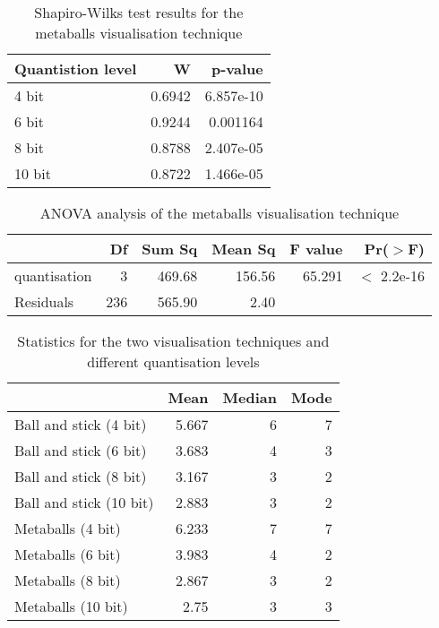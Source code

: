 \begin{table}[h!]
  \begin{tabular}{ | l | r | r | }
  \hline
  Quantistion level &      W &   p-value  \\ \hline
  4 bit             & 0.6942 & 6.857e-10  \\ \hline
  6 bit             & 0.9244 &  0.001164  \\ \hline
  8 bit             & 0.8788 & 2.407e-05  \\ \hline
  10 bit            & 0.8722 & 1.466e-05  \\ \hline
  \end{tabular}
  \caption{Shapiro-Wilks test results for the metaballs visualisation
  technique}
  \label{tab:metaballs_normality}
\end{table}


\begin{table}[h!]
  \begin{tabular}{ | l | r | r | r | r | r | }
  \hline
               &  Df & Sum Sq & Mean Sq & F value &    Pr($>$F)  \\ \hline
  quantisation &   3 & 469.68 &  156.56 &  65.291 & $<$ 2.2e-16  \\ \hline
  Residuals    & 236 & 565.90 &    2.40 &         &              \\ \hline
  \end{tabular}
  \caption{ANOVA analysis of the metaballs visualisation technique}
  \label{tab:metaballs_anova}
\end{table}



\begin{table}[h!]
  \begin{tabular}{ | l | r | r | r | }
  \hline
                          &  Mean & Median & Mode  \\ \hline
  Ball and stick (4 bit)  & 5.667 &      6 &    7  \\ \hline
  Ball and stick (6 bit)  & 3.683 &      4 &    3  \\ \hline
  Ball and stick (8 bit)  & 3.167 &      3 &    2  \\ \hline
  Ball and stick (10 bit) & 2.883 &      3 &    2  \\ \hline
  Metaballs (4 bit)       & 6.233 &      7 &    7  \\ \hline
  Metaballs (6 bit)       & 3.983 &      4 &    2  \\ \hline
  Metaballs (8 bit)       & 2.867 &      3 &    2  \\ \hline
  Metaballs (10 bit)      &  2.75 &      3 &    3  \\ \hline
  \end{tabular}
  \caption{Statistics for the two visualisation techniques and different
  quantisation levels}
  \label{tab:experiment_statistics}
\end{table}


